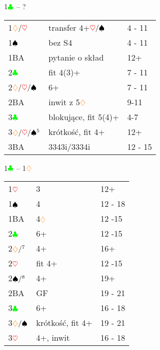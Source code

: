 \documentclass[a4paper,11pt]{article}
\newcommand{\CC}{\textcolor{green}\clubsuit}
\newcommand{\DD}{\textcolor{orange}\diamondsuit}
\newcommand{\HH}{\textcolor{red}\heartsuit}
\newcommand{\PP}{\textcolor{black}\spadesuit}
\begin{document}

\begin{center}\LARGE{1$\CC$ -- ?\footnotemark[1]}\\
\end{center}
\begin{tabular}{p{2cm} p{10cm} l}
	1$\DD/\HH$ & transfer 4+$\HH/\PP$ & 4 - 11\\
	1$\PP$ & bez S4 & 4 - 11\\
	1BA\footnotemark[2] & pytanie o skład\footnotemark[3] & 12+\\
	2$\CC$\footnotemark[4] & fit 4(3)+ & 7 - 11\\
	2$\DD/\HH/\PP$ & 6+ & 7 - 11\\
	2BA & inwit z 5$\DD$ & 9-11\\
	3$\CC$ & blokujące, fit 5(4)+ & 4-7\\
	3$\DD/\HH/\PP\footnotemark[5]$ & krótkość, fit 4+  & 12+\\
	3BA & 3343i/3334i & 12 - 15\\
\end{tabular}

\begin{center}\LARGE{1$\CC$ -- 1$\DD$}\\
\end{center}
\begin{tabular}{p{2cm} p{10cm} l}
	1$\HH$ & 3\footnotemark[6] & 12+\\
	1$\PP$ & 4 & 12 - 18\\
	1BA & 4$\DD$ & 12 -15\\
	2$\CC$ & 6+ & 12 -15\\
	2$\DD/\footnotemark[7]$ & 4+ & 16+\\
	2$\HH$ & fit 4+ & 12 -15\\
	2$\PP/\footnotemark[8]$ & 4+ & 19+\\
	2BA & GF & 19 - 21\\
	3$\CC$ & 6+ & 16 - 18\\
	3$\DD/\PP$ & krótkość, fit 4+ & 19 - 21\\
	3$\HH$ & 4+, inwit & 16 - 18\\
\end{tabular}
\end{document}
